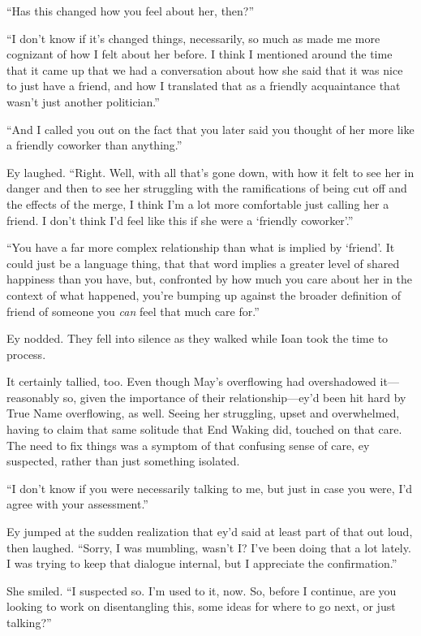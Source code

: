 ``Has this changed how you feel about her, then?''

``I don't know if it's changed things, necessarily, so much as made me more cognizant of how I felt about her before. I think I mentioned around the time that it came up that we had a conversation about how she said that it was nice to just have a friend, and how I translated that as a friendly acquaintance that wasn't just another politician.''

``And I called you out on the fact that you later said you thought of her more like a friendly coworker than anything.''

Ey laughed. ``Right. Well, with all that's gone down, with how it felt to see her in danger and then to see her struggling with the ramifications of being cut off and the effects of the merge, I think I'm a lot more comfortable just calling her a friend. I don't think I'd feel like this if she were a `friendly coworker'.''

``You have a far more complex relationship than what is implied by `friend'. It could just be a language thing, that that word implies a greater level of shared happiness than you have, but, confronted by how much you care about her in the context of what happened, you're bumping up against the broader definition of friend of someone you \emph{can} feel that much care for.''

Ey nodded. They fell into silence as they walked while Ioan took the time to process.

It certainly tallied, too. Even though May's overflowing had overshadowed it—reasonably so, given the importance of their relationship—ey'd been hit hard by True Name overflowing, as well. Seeing her struggling, upset and overwhelmed, having to claim that same solitude that End Waking did, touched on that care. The need to fix things was a symptom of that confusing sense of care, ey suspected, rather than just something isolated.

``I don't know if you were necessarily talking to me, but just in case you were, I'd agree with your assessment.''

Ey jumped at the sudden realization that ey'd said at least part of that out loud, then laughed. ``Sorry, I was mumbling, wasn't I? I've been doing that a lot lately. I was trying to keep that dialogue internal, but I appreciate the confirmation.''

She smiled. ``I suspected so. I'm used to it, now. So, before I continue, are you looking to work on disentangling this, some ideas for where to go next, or just talking?''

